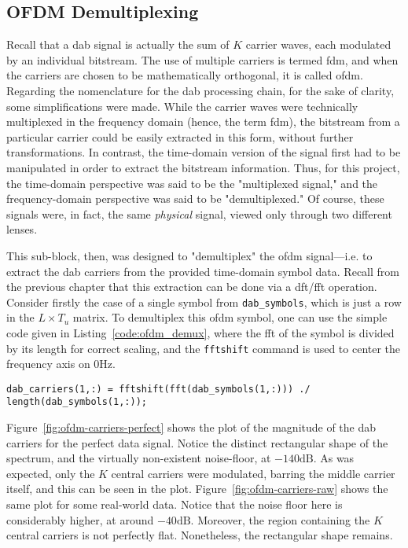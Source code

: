 \documentclass[class=report,11pt,crop=false]{standalone}
\begin{document}
\subsection{OFDM Demultiplexing \label{subsect:dab-proc_ofdm-demux}}
Recall that a \gls{dab} signal is actually the sum of \(K\) carrier waves, each modulated by an individual bitstream. The use of multiple carriers is termed \acrlong{fdm}, and when the carriers are chosen to be mathematically orthogonal, it is called \acrlong{ofdm}. Regarding the nomenclature for the \gls{dab} processing chain, for the sake of clarity, some simplifications were made. While the carrier waves were technically multiplexed in the frequency domain (hence, the term \acrshort{fdm}), the bitstream from a particular carrier could be easily extracted in this form, without further transformations. In contrast, the time-domain version of the signal first had to be manipulated in order to extract the bitstream information. Thus, for this project, the time-domain perspective was said to be the "multiplexed signal," and the frequency-domain perspective was said to be "demultiplexed." Of course, these signals were, in fact, the same \emph{physical} signal, viewed only through two different lenses.

This sub-block, then, was designed to "demultiplex" the \gls{ofdm} signal---i.e. to extract the \gls{dab} carriers from the provided time-domain symbol data. Recall from the previous chapter that this extraction can be done via a \gls{dft}/\gls{fft} operation. Consider firstly the case of a single symbol from \texttt{dab\_symbols}, which is just a row in the \(L \times T_u\) matrix. To demultiplex this \gls{ofdm} symbol, one can use the simple code given in Listing~\ref{code:ofdm_demux}, where the \gls{fft} of the symbol is divided by its length for correct scaling, and the \texttt{fftshift} command is used to center the frequency axis on \(0\si{\hertz}\).

\begin{lstlisting}[caption={MATLAB code for demultiplexing an \gls{ofdm} symbol}, label={code:ofdm_demux}]
dab_carriers(1,:) = fftshift(fft(dab_symbols(1,:))) ./ length(dab_symbols(1,:));
\end{lstlisting}

Figure~\ref{fig:ofdm-carriers-perfect} shows the plot of the magnitude of the \gls{dab} carriers for the perfect data signal. Notice the distinct rectangular shape of the spectrum, and the virtually non-existent noise-floor, at \(-140\si{\deci\bel}\). As was expected, only the \(K\) central carriers were modulated, barring the middle carrier itself, and this can be seen in the plot. Figure~\ref{fig:ofdm-carriers-raw} shows the same plot for some real-world data. Notice that the noise floor here is considerably higher, at around \(-40\si{\deci\bel}\). Moreover, the region containing the \(K\) central carriers is not perfectly flat. Nonetheless, the rectangular shape remains.
\end{document}

